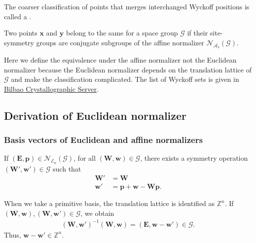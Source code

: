 
The coarser classification of points that merges interchanged Wyckoff positions is called a .
\begin{screen}
  \begin{defn}
    Two points $\bm{x}$ and $\bm{y}$ belong to the same  for a space group $\mathcal{G}$ if their site-symmetry groups are conjugate subgroups of the affine normalizer $\mathcal{N}_{\mathcal{A}_{3}}(\mathcal{G})$.
  \end{defn}
\end{screen}
Here we define the equivalence under the affine normalizer not the Euclidean normalizer because the Euclidean normalizer depends on the translation lattice of $\mathcal{G}$ and make the classification complicated.
The list of Wyckoff sets is given in \href{https://www.cryst.ehu.es/html/cryst/wyckoffsets.html}{Bilbao Crystallographic Server}.

%

\subsection{Derivation of Euclidean normalizer}

\subsubsection{Basis vectors of Euclidean and affine normalizers}

If $( \bm{E}, \bm{p} ) \in \mathcal{N}_{\mathcal{E}_{n}}(\mathcal{G}) $, for all $(\bm{W}, \bm{w} ) \in \mathcal{G}$, there exists a symmetry operation $(\bm{W}', \bm{w}' ) \in \mathcal{G}$ such that
\begin{align}
  \bm{W}' &= \bm{W} \\
  \bm{w}' &= \bm{p} + \bm{w} - \bm{Wp}.
\end{align}

When we take a primitive basis, the translation lattice is identified as $\mathbb{Z}^{n}$.
If $(\bm{W}, \bm{w} ), (\bm{W}, \bm{w}') \in \mathcal{G}$, we obtain
\begin{align}
  (\bm{W}, \bm{w}')^{-1} (\bm{W}, \bm{w}) = (\bm{E}, \bm{w} - \bm{w}' ) \in \mathcal{G}.
\end{align}
Thus, $\mathbf{w} - \mathbf{w}' \in \mathbb{Z}^{n}$.


